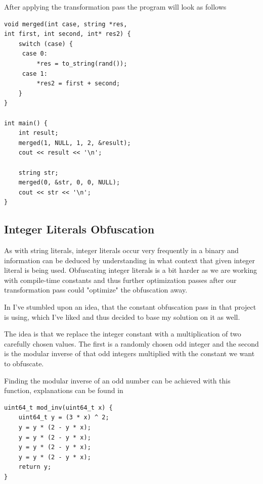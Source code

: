 After applying the transformation pass the program will look as follows

\lstset{language=C++} %
\lstset{basicstyle=\ttfamily} %
\begin{lstlisting}
void merged(int case, string *res,
int first, int second, int* res2) {
    switch (case) {
     case 0:
         *res = to_string(rand());
     case 1:
         *res2 = first + second;
    }
}

int main() {
    int result;
    merged(1, NULL, 1, 2, &result);
    cout << result << '\n';

    string str;
    merged(0, &str, 0, 0, NULL);
    cout << str << '\n';
}
\end{lstlisting}

\subsection{Integer Literals Obfuscation}

As with string literals, integer literals occur very frequently in a binary and information can be deduced by understanding
in what context that given integer literal is being used. Obfuscating integer literals is a bit harder as we are working with compile-time
constants and thus further optimization passes after our transformation pass could "optimize" the obfuscation away.

In \cite{YANSOllvm} I've stumbled upon an idea, that the constant obfuscation pass in that project is using, which I've liked
and thus decided to base my solution on it as well.

The idea is that we replace the integer constant with a multiplication of two carefully chosen values. The first is a randomly chosen
odd integer and the second is the modular inverse of that odd integers multiplied with the constant we want to obfuscate.

Finding the modular inverse of an odd number can be achieved with this function, explanations can be found in \cite{odd1, odd2}

\lstset{language=C++} %
\lstset{basicstyle=\ttfamily} %
\begin{lstlisting}
uint64_t mod_inv(uint64_t x) {
    uint64_t y = (3 * x) ^ 2;
    y = y * (2 - y * x);
    y = y * (2 - y * x);
    y = y * (2 - y * x);
    y = y * (2 - y * x);
    return y;
}
\end{lstlisting}

